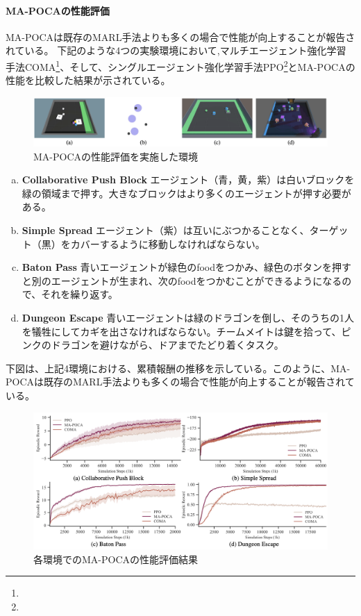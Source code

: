   \paragraph{MA-POCAの性能評価}
  MA-POCAは既存のMARL手法よりも多くの場合で性能が向上することが報告されている\cite{mapoca}。
  下記のような4つの実験環境において,マルチエージェント強化学習手法COMA\footnote{}、そして、シングルエージェント強化学習手法PPO\footnote{}とMA-POCAの性能を比較した結果が示されている。
  \begin{figure}[H] 
    \centering 
    \includegraphics[width=1.0\textwidth]{Figures/2022-10-06_10.03.52.png}
    \caption{MA-POCAの性能評価を実施した環境} 
    \label{fig:01} 
  \end{figure}
  \begin{enumerate}[(a)]
    \item \textbf{Collaborative Push Block}
    エージェント（青，黄，紫）は白いブロックを緑の領域まで押す。大きなブロックはより多くのエージェントが押す必要がある。
  
    \item \textbf{Simple Spread}
    エージェント（紫）は互いにぶつかることなく、ターゲット（黒）をカバーするように移動しなければならない。
    
    \item \textbf{Baton Pass}
    青いエージェントが緑色のfoodをつかみ、緑色のボタンを押すと別のエージェントが生まれ、次のfoodをつかむことができるようになるので、それを繰り返す。
    
    \item \textbf{Dungeon Escape}
    青いエージェントは緑のドラゴンを倒し、そのうちの1人を犠牲にしてカギを出さなければならない。チームメイトは鍵を拾って、ピンクのドラゴンを避けながら、ドアまでたどり着くタスク。
\end{enumerate}
下図は、上記4環境における、累積報酬の推移を示している。このように、MA-POCAは既存のMARL手法よりも多くの場合で性能が向上することが報告されている。
\begin{figure}[H] 
  \centering 
  \includegraphics[width=1.0\textwidth]{Figures/2022-10-06_10.04.14-min.png}
  \caption{各環境でのMA-POCAの性能評価結果} 
  \label{fig:01} 
\end{figure}

